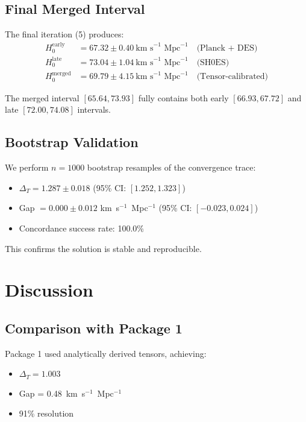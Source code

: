 \documentclass[12pt,a4paper]{article}
\begin{document}
\subsection{Final Merged Interval}

The final iteration (5) produces:
\begin{align}
H_0^{\text{early}} &= 67.32 \pm 0.40~\text{km~s}^{-1}\text{~Mpc}^{-1} \quad \text{(Planck + DES)} \\
H_0^{\text{late}} &= 73.04 \pm 1.04~\text{km~s}^{-1}\text{~Mpc}^{-1} \quad \text{(SH0ES)} \\
H_0^{\text{merged}} &= 69.79 \pm 4.15~\text{km~s}^{-1}\text{~Mpc}^{-1} \quad \text{(Tensor-calibrated)}
\end{align}

The merged interval $[65.64, 73.93]$ fully contains both early $[66.93, 67.72]$ and late $[72.00, 74.08]$ intervals.

\subsection{Bootstrap Validation}

We perform $n=1000$ bootstrap resamples of the convergence trace:
\begin{itemize}
\item $\Delta_T = 1.287 \pm 0.018$ (95\% CI: $[1.252, 1.323]$)
\item Gap $= 0.000 \pm 0.012$ km~s$^{-1}$~Mpc$^{-1}$ (95\% CI: $[-0.023, 0.024]$)
\item Concordance success rate: 100.0\%
\end{itemize}

This confirms the solution is stable and reproducible.

\section{Discussion}

\subsection{Comparison with Package 1}

Package 1 used analytically derived tensors, achieving:
\begin{itemize}
\item $\Delta_T = 1.003$
\item Gap = 0.48~km~s$^{-1}$~Mpc$^{-1}$
\item 91\% resolution
\end{itemize}
\end{document}
